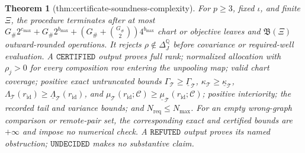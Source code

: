 \documentclass{article}
\newtheorem{theorem}{Theorem}
\begin{document}
\begin{theorem}[thm:certificate-soundness-complexity]\label{thm:certificate-soundness-complexity}
For \(p\geq3\), fixed \(\iota\), and finite \(\Xi\), the procedure terminates after at most \(G_{\#}2^{c_{\max}}+G_{\#}2^{b_{\max}}+(G_{\#}+\binom{G_{\#}}{2})4^{b_{\max}}\) chart or objective leaves and \(\mathfrak B(\Xi)\) outward-rounded operations. It rejects \(\rho\notin\Delta_J^{\mathbb Q}\) before covariance or required-well evaluation. A \(\mathtt{CERTIFIED}\) output proves full rank; normalized allocation with \(\rho_j>0\) for every composition row entering the unpooling map; valid chart coverage; positive exact untruncated bounds \(\Gamma_{\mathcal T}\geq\underline\Gamma_{\mathcal T}\), \(\kappa_{\mathcal T}\geq\underline\kappa_{\mathcal T}\), \(\Lambda_{\mathcal T}(r_{\mathrm{id}})\geq\underline\Lambda_{\mathcal T}(r_{\mathrm{id}})\), and \(\mu_{\mathcal T}(r_{\mathrm{id}};\mathscr C)\geq\underline\mu_{\mathcal T}(r_{\mathrm{id}};\mathscr C)\); positive interiority; the recorded tail and variance bounds; and \(N_{\mathrm{req}}\leq N_{\max}\). For an empty wrong-graph comparison or remote-pair set, the corresponding exact and certified bounds are \(+\infty\) and impose no numerical check. A \(\mathtt{REFUTED}\) output proves its named obstruction; \(\mathtt{UNDECIDED}\) makes no substantive claim.
\end{theorem}
\end{document}
